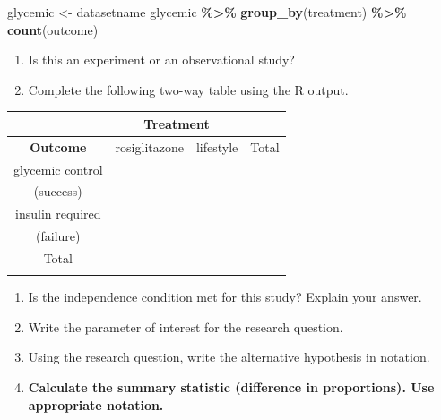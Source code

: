 \documentclass[
]{report}
\newenvironment{Shaded}{\begin{snugshade}}{\end{snugshade}}
\newcommand{\FunctionTok}[1]{\textcolor[rgb]{0.13,0.29,0.53}{\textbf{#1}}}
\newcommand{\NormalTok}[1]{#1}
\newcommand{\OtherTok}[1]{\textcolor[rgb]{0.56,0.35,0.01}{#1}}
\newcommand{\SpecialCharTok}[1]{\textcolor[rgb]{0.81,0.36,0.00}{\textbf{#1}}}
\begin{document}
\begin{Shaded}
\begin{Highlighting}[]
\NormalTok{glycemic }\OtherTok{\textless{}{-}}\NormalTok{ datasetname}
\NormalTok{glycemic }\SpecialCharTok{\%\textgreater{}\%} \FunctionTok{group\_by}\NormalTok{(treatment) }\SpecialCharTok{\%\textgreater{}\%} \FunctionTok{count}\NormalTok{(outcome)}
\end{Highlighting}
\end{Shaded}

\begin{enumerate}
\def\labelenumi{\arabic{enumi}.}
\item
  Is this an experiment or an observational study?
  \vspace{0.2in}
\item
  Complete the following two-way table using the R output.
\end{enumerate}

\begin{center}
\begin{tabular}{|c|c|c|c|}\hline
 & \multicolumn{2}{|c|}{\textbf{Treatment}} & \\ \hline
\textbf{Outcome} & \hspace{0.35in} rosiglitazone \hspace{0.35in} & \hspace{0.35in} lifestyle \hspace{0.35in} & \hspace{0.35in} Total \hspace{0.35in} \\ \hline
 glycemic control & & & \\ 
 (success) & & & \\ \hline
 insulin required & & & \\ 
 (failure) & & & \\ \hline
 Total & & &  \\ 
 & & & \\ \hline  
\end{tabular}
\end{center}

\begin{enumerate}
\def\labelenumi{\arabic{enumi}.}
\setcounter{enumi}{2}
\item
  Is the independence condition met for this study? Explain your answer.
  \vspace{0.6in}
\item
  Write the parameter of interest for the research question.
  \vspace{0.6in}
\item
  Using the research question, write the alternative hypothesis in notation.
  \vspace{0.3in}
\item
  \textbf{Calculate the summary statistic (difference in proportions). Use appropriate notation.}
  \vspace{0.3in}
\end{enumerate}
\end{document}
